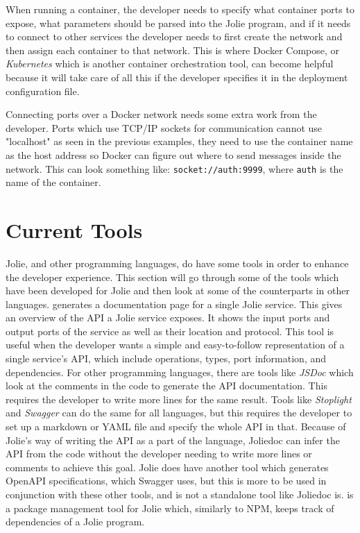 When running a container, the developer needs to specify what container ports to expose, what parameters should be parsed into the Jolie program, and if it needs to connect to other services the developer needs to first create the network and then assign each container to that network.
This is where Docker Compose, or \textit{Kubernetes} which is another container orchestration tool, can become helpful because it will take care of all this if the developer specifies it in the deployment configuration file.

Connecting ports over a Docker network needs some extra work from the developer. Ports which use TCP/IP sockets for communication cannot use "localhost" as seen in the previous examples, they need to use the container name as the host address so Docker can figure out where to send messages inside the network.
This can look something like: \texttt{socket://auth:9999}, where \texttt{auth} is the name of the container.

\section{Current Tools}
Jolie, and other programming languages, do have some tools in order to enhance the developer experience. This section will go through some of the tools
which have been developed for Jolie and then look at some of the counterparts in other languages.
%
 generates a documentation page for a single Jolie service. This gives an overview of the API a Jolie service exposes. It shows the input ports and output ports of the service as well as their location and protocol.
This tool is useful when the developer wants a simple and easy-to-follow representation of a single service's API, which include operations, types, port information, and dependencies.
For other programming languages, there are tools like \textit{JSDoc} which look at the comments in the code to generate the API documentation. This requires the developer to write more lines for the same result.
Tools like \textit{Stoplight} and \textit{Swagger} can do the same for all languages, but this requires the developer to set up a markdown or YAML file and specify the whole API in that.
Because of Jolie's way of writing the API as a part of the language, Joliedoc can infer the API from the code without the developer needing to write more lines or comments to achieve this goal.
Jolie does have another tool which generates OpenAPI specifications, which Swagger uses, but this is more to be used in conjunction with these other tools, and is not a standalone tool like Joliedoc is.
 is a package management tool for Jolie which, similarly to NPM, keeps track of dependencies of a Jolie program.

